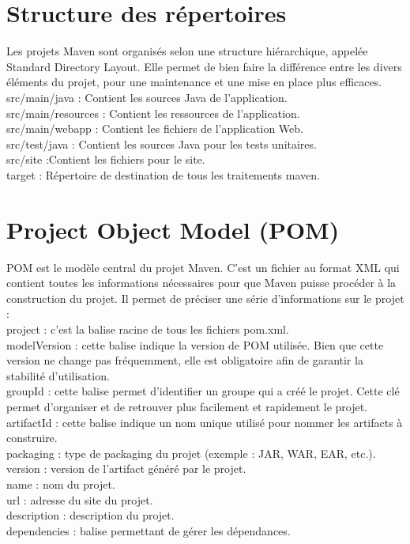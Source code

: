 \documentclass{report}
\begin{document}
\section{Structure des répertoires}
Les projets Maven sont organisés selon une structure hiérarchique, appelée Standard Directory Layout. Elle permet de bien faire la différence entre les divers éléments du projet, pour une maintenance et une mise en place plus efficaces.\\
src/main/java : Contient les sources Java de l'application. \\
src/main/resources : Contient les ressources de l'application.\\
src/main/webapp : Contient les fichiers de l'application Web.\\
src/test/java : Contient les sources Java pour les tests unitaires.\\
src/site :Contient les fichiers pour le site.\\
target : Répertoire de destination de tous les traitements maven.\\

\section{Project Object Model (POM) }
POM est le modèle central du projet Maven. C'est un fichier au format XML qui contient toutes les informations nécessaires pour que Maven puisse procéder à la construction du projet. Il permet de préciser une série d'informations sur le projet :\\
project : c'est la balise racine de tous les fichiers pom.xml.\\
modelVersion : cette balise indique la version de POM utilisée. Bien que cette version ne change pas fréquemment, elle est obligatoire afin de garantir la stabilité d'utilisation.\\
groupId : cette balise permet d'identifier un groupe qui a créé le projet. Cette clé permet d'organiser et de retrouver plus facilement et rapidement le projet.\\
artifactId : cette balise indique un nom unique utilisé pour nommer les artifacts à construire.\\
packaging : type de packaging du projet (exemple : JAR, WAR, EAR, etc.).\\
version : version de l'artifact généré par le projet.\\
name : nom du projet.\\
url : adresse du site du projet.\\
description : description du projet.\\
dependencies : balise permettant de gérer les dépendances.
\end{document}
